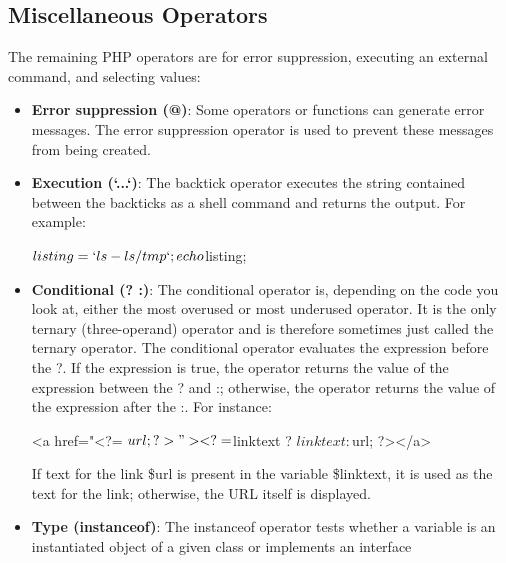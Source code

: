 \documentclass{report}
\begin{document}
\subsection{Miscellaneous Operators}
\bigbreak \noindent 
The remaining PHP operators are for error suppression, executing an external command, and selecting values:
\bigbreak \noindent 
\begin{itemize}
    \item \textbf{Error suppression (@)}: Some operators or functions can generate error messages. The error suppression operator is used to prevent these messages from being created.
    \item \textbf{Execution (`...`)}: The backtick operator executes the string contained between the backticks as a shell command and returns the output. For example:
        \bigbreak \noindent 
        \begin{phpcode}
            $listing = `ls -ls /tmp`;
            echo $listing;
        \end{phpcode}
    \item \textbf{Conditional (? :)}: The conditional operator is, depending on the code you look at, either the most overused or most underused operator. It is the only ternary (three-operand) operator and is therefore sometimes just called the ternary operator. The conditional operator evaluates the expression before the ?. If the expression is true, the operator returns the value of the expression between the ? and :; otherwise, the operator returns the value of the expression after the :. For instance:
        \bigbreak \noindent 
        \begin{phpcode}
        <a href="<?= $url; ?>"><?= $linktext ? $linktext : $url; ?></a>
        \end{phpcode}
        \bigbreak \noindent 
        If text for the link \$url is present in the variable \$linktext, it is used as the text for the link; otherwise, the URL itself is displayed.
    \item \textbf{Type (instanceof)}: The instanceof operator tests whether a variable is an instantiated object of a given class or implements an interface
        \bigbreak \noindent 
\end{itemize}

\pagebreak 
{}
\bigbreak \noindent 
\end{document}
